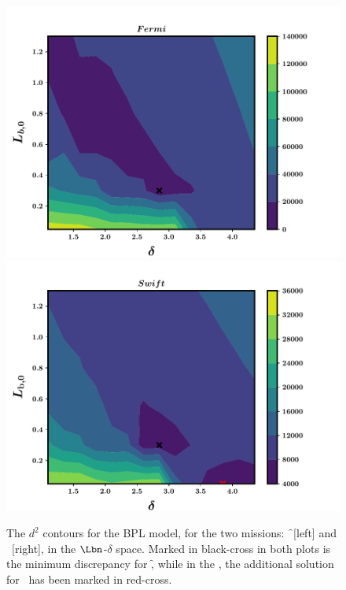 \begin{figure}
\begin{center}
\includegraphics[scale=0.42]{discrepancy_contours--Fermi}
\includegraphics[scale=0.42]{discrepancy_contours--Swift}
\caption[$d^2$ contours for the BPL model]{The $d^2$  contours for the BPL model, for the two missions: \f\ [left] and \s\ [right], in the $\Lbn$-$\delta$ space. Marked in black-cross in both plots is the minimum discrepancy for \f, while in the \eR, the additional solution for \s\ has been marked in red-cross.}
\label{fig:discrepancy_contours}
\end{center}
\end{figure}



